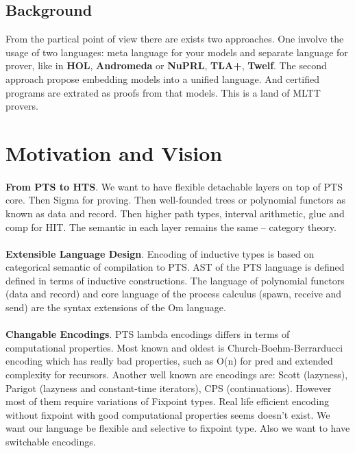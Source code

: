 \documentclass[11pt,oneside]{article}
\begin{document}
\subsection{Background}
From the partical point of view there are exists two approaches.
One involve the usage of two languages: meta language for your models
and separate language for prover, like in {\bf HOL}, {\bf Andromeda} or {\bf NuPRL}, {\bf TLA+}, {\bf Twelf}.
The second approach propose embedding models into a unified language.
And certified programs are extrated as proofs from that models. This is a land of MLTT provers.

\newpage
\section{Motivation and Vision}

\paragraph{}
{\bf From PTS to HTS}. We want to have flexible detachable
layers on top of PTS core. Then Sigma for proving.
Then well-founded trees or polynomial functors as known as data and record.
Then higher path types, interval arithmetic, glue and comp for HIT. The semantic
in each layer remains the same -- category theory.

\paragraph{}
{\bf Extensible Language Design}. Encoding of inductive types is based on categorical
semantic of compilation to PTS. AST of the PTS language is defined
defined in terms of inductive constructions. The language of polynomial
functors (data and record) and core language of the process calculus
(spawn, receive and send) are the syntax extensions of the Om language.

\paragraph{}
{\bf Changable Encodings}. PTS lambda encodings differs in terms of computational properties.
Most known and oldest is Church-Boehm-Berrarducci encoding which has really bad properties,
such as O(n) for pred and extended complexity for recursors.
Another well known are encodings are: Scott (lazyness),
Parigot (lazyness and constant-time iterators), CPS (continuations).
However most of them require variations of Fixpoint types.
Real life efficient encoding without fixpoint with good
computational properties seems doesn't exist. We want our language
be flexible and selective to fixpoint type. Also we want to have switchable encodings.
\end{document}
